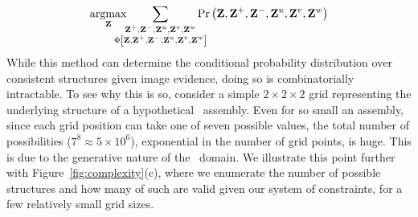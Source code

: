 \par\vspace*{-2ex}
\begin{equation}
  \argmax_{\mathbf{Z}}\hspace{-13pt}
  \sum_{\substack{\mathbf{Z}^+,\mathbf{Z}^-,\mathbf{Z}^u,\mathbf{Z}^v,\mathbf{Z}^w\\
      \Phi\left[\mathbf{Z},\mathbf{Z}^+,\mathbf{Z}^-,\mathbf{Z}^u,\mathbf{Z}^v,\mathbf{Z}^w\right]}}
  \hspace{-10pt}\Pr\left(\mathbf{Z},\mathbf{Z}^{+},\mathbf{Z}^{-},\mathbf{Z}^u,\mathbf{Z}^v,\mathbf{Z}^w\right)
  \label{eq:structure-estimation}
\end{equation}
%
While this method can determine the conditional probability distribution over
consistent structures given image evidence, doing so is combinatorially
intractable.
%
To see why this is so, consider a simple $2 \times 2 \times 2$ grid
representing the underlying structure of a hypothetical \LincolnLog\ assembly.
%
Even for so small an assembly, since each grid position can take one of seven
possible values, the total number of possibilities ($7^8 \approx 5 \times
10^6$), exponential in the number of grid points, is huge.
%
This is due to the generative nature of the \LincolnLog\ domain.
%
We illustrate this point further with Figure~\ref{fig:complexity}(c), where we
enumerate the number of possible structures and how many of such are valid
given our system of constraints, for a few relatively small grid sizes.

